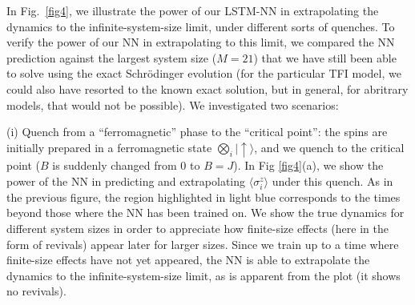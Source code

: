 \documentclass[a4paper,aps,amsmath,amssymb,twocolumn,longbibliography,,accepted=2022-05-17]{quantumarticle}
\begin{document}
In Fig.~\ref{fig4}, we illustrate the power of our LSTM-NN in extrapolating the dynamics to the infinite-system-size limit, under different sorts of quenches. To verify the power of our NN in extrapolating to this limit, we compared the NN prediction against the largest system size ($M=21$) that we have still been able to solve using the exact Schr\"odinger evolution (for the particular TFI model, we could also have resorted to the known exact solution, but in general, for abritrary models, that would not be possible). %
We investigated two scenarios:

(i) Quench from a ``ferromagnetic'' phase to the ``critical point'': the spins are initially prepared in a ferromagnetic state $\bigotimes_i|\uparrow\rangle$, and we quench to the critical point ($B$ is suddenly changed from $0$ to $B=J$). In Fig \ref{fig4}(a), we show the power of the NN in predicting and extrapolating $\langle \sigma^z _i\rangle$ under this quench. As in the previous figure, the region highlighted in light blue corresponds to the times beyond those where the NN has been trained on. We show the true dynamics for different system sizes in order to appreciate how finite-size effects (here in the form of revivals) appear later for larger sizes. Since we train up to a time where finite-size effects have not yet appeared, the NN is able to extrapolate the dynamics to the infinite-system-size limit, as is apparent from the plot (it shows no revivals).

\end{document}
